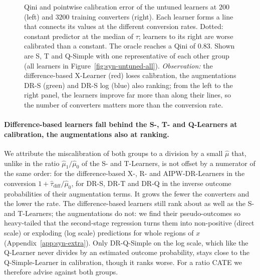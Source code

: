 \documentclass{article}
\begin{document}
\begin{figure}[H]
\centering
{}
\caption{Qini and pointwise calibration error of the untuned learners at
$200$ (left) and $3200$ training converters (right). Each learner forms a line
that connects its values at the different conversion rates. Dotted: constant
predictor at the median of $\tau$; learners to its right are worse calibrated
than a constant. The oracle reaches a Qini of $0.83$. Shown are S, T and
Q-Simple with one representative of each other group (all learners in
Figure~\ref{fig:syn-untuned-all}). \emph{Observation:} the difference-based
X-Learner (red) loses calibration, the augmentations DR-S (green) and DR-S
log (blue) also ranking; from the left to the right panel, the learners
improve far more than along their lines, so the number of converters matters
more than the conversion rate.}
\label{fig:syn-untuned-v2}
\end{figure}

\paragraph{Difference-based learners fall behind the S-, T- and Q-Learners
at calibration, the augmentations also at ranking.}
We attribute the miscalibration of both groups to a division by a small
$\hat\mu$ that, unlike in the ratio $\hat\mu_1/\hat\mu_0$ of the S- and
T-Learners, is not offset by a numerator of the same order: for the
difference-based X-, R- and AIPW-DR-Learners in the conversion
$1 + \hat\tau_{\text{diff}}/\hat\mu_0$, for DR-S, DR-T and DR-Q in the
inverse outcome probabilities of their augmentation terms. It grows the fewer
the converters and the lower the rate. The difference-based learners still
rank about as well as the S- and T-Learners; the augmentations do not: we
find their pseudo-outcomes so heavy-tailed that the second-stage regression
turns them into non-positive (direct scale) or exploding (log scale)
predictions for whole regions of $x$ (Appendix~\ref{app:syn-extra}). Only
DR-Q-Simple on the log scale, which like the Q-Learner never divides by an
estimated outcome probability, stays close to the Q-Simple-Learner in
calibration, though it ranks worse. For a ratio CATE we therefore advise
against both groups.
\end{document}
